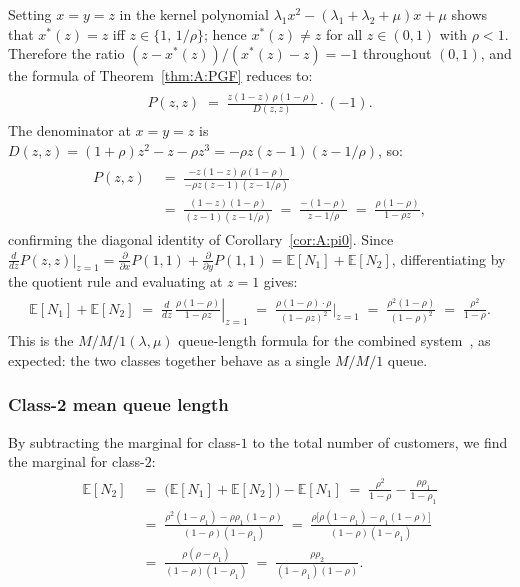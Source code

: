 \documentclass{article}
\numberwithin{equation}{section}
\begin{document}
Setting $x=y=z$ in the kernel polynomial $\lambda_1 x^2-(\lambda_1+\lambda_2+\mu)x+\mu$
shows that $x^*(z)=z$ iff $z\in\{1,\,1/\rho\}$; hence $x^*(z)\neq z$ for all
$z\in(0,1)$ with $\rho<1$. Therefore the ratio
$(z-x^*(z))/(x^*(z)-z)=-1$ throughout $(0,1)$, and the formula of
Theorem~\ref{thm:A:PGF} reduces to:
\begin{align*}
    \begin{split}
        P(z,z)
        \;=\; \frac{z(1-z)\,\rho(1-\rho)}{D(z,z)}\cdot(-1).
    \end{split}
\end{align*}
The denominator at $x=y=z$ is
$D(z,z)=(1+\rho)z^2-z-\rho z^3=-\rho z(z-1)(z-1/\rho)$,
so:
\begin{align}
    \begin{split}
        P(z,z)
        &\;=\; \frac{-z(1-z)\,\rho(1-\rho)}{-\rho z(z-1)(z-1/\rho)} \\
        &\;=\; \frac{(1-z)(1-\rho)}{(z-1)(z-1/\rho)}
         \;=\; \frac{-(1-\rho)}{z-1/\rho}
         \;=\; \frac{\rho(1-\rho)}{1-\rho z},
    \end{split}
    \label{eq:A:Pzz}
\end{align}
confirming the diagonal identity of Corollary~\ref{cor:A:pi0}.
Since $\tfrac{d}{dz}P(z,z)\big|_{z=1}
=\tfrac{\partial }{\partial x}P(1,1)+\tfrac{\partial }{\partial y}P(1,1)
=\mathbb{E}[N_1]+\mathbb{E}[N_2]$, differentiating by the quotient rule and
evaluating at $z=1$ gives:
\begin{align*}
    \begin{split}
        \mathbb{E}[N_1]+\mathbb{E}[N_2]
        \;=\; \left.\frac{d}{dz}\,\frac{\rho(1-\rho)}{1-\rho z}\right|_{z=1}
        \;=\; \frac{\rho(1-\rho)\cdot\rho}{(1-\rho z)^2}\bigg|_{z=1}
        \;=\; \frac{\rho^2(1-\rho)}{(1-\rho)^2}
        \;=\; \frac{\rho^2}{1-\rho}.
    \end{split}
\end{align*}
This is the $M/M/1(\lambda,\mu)$ queue-length formula for the combined
system~\cite{adan2002queueing}, as expected: the two classes together behave as a
single $M/M/1$ queue.

\subsubsection{Class-2 mean queue length}
By subtracting the marginal for class-$1$ to the total number of customers, we find the marginal for class-$2$:
\begin{align}
    \begin{split}
        \mathbb{E}[N_2]
        &\;=\; \bigl(\mathbb{E}[N_1]+\mathbb{E}[N_2]\bigr)-\mathbb{E}[N_1]
        \;=\; \frac{\rho^2}{1-\rho} - \frac{\rho\rho_1}{1-\rho_1} \\[4pt]
        &\;=\; \frac{\rho^2(1-\rho_1)-\rho\rho_1(1-\rho)}{(1-\rho)(1-\rho_1)}
        \;=\; \frac{\rho\bigl[\rho(1-\rho_1)-\rho_1(1-\rho)\bigr]}{(1-\rho)(1-\rho_1)} \\[4pt]
        &\;=\; \frac{\rho(\rho-\rho_1)}{(1-\rho)(1-\rho_1)}
        \;=\; \frac{\rho\rho_2}{(1-\rho_1)(1-\rho)}.
    \end{split}
    \label{eq:A:EN2}
\end{align}
\end{document}
